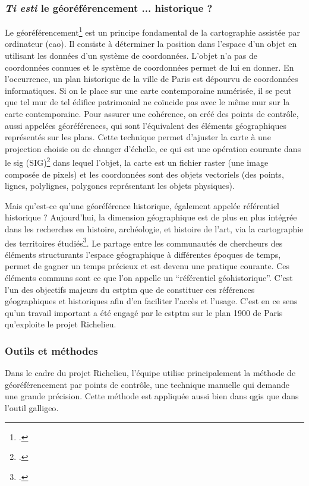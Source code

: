 \subsubsection{\textit{Ti esti} le géoréférencement ... historique ?}
Le géoréférencement\footcite{GEOCONFLUENCESGeoreferencement2024} est un principe fondamental de la cartographie assistée par ordinateur (\acrshort{cao}). Il consiste à déterminer la position dans l'espace d'un objet en utilisant les données d'un système de coordonnées. L'objet n'a pas de coordonnées connues et le système de coordonnées permet de lui en donner. En l'occurrence, un plan historique de la ville de Paris est dépourvu de coordonnées informatiques. Si on le place sur une carte contemporaine numérisée, il se peut que tel mur de tel édifice patrimonial ne coïncide pas avec le même mur sur la carte contemporaine. Pour assurer une cohérence, on créé des points de contrôle, aussi appelées géoréférences, qui sont l'équivalent des éléments géographiques représentés sur les plans. Cette technique permet d'ajuster la carte à une projection choisie ou de changer d'échelle, ce qui est une opération courante dans le \acrlong{sig} (SIG)\footcite{BERNIERconcepts2014} dans lequel l'objet, la carte est un fichier raster (une image composée de pixels) et les coordonnées sont des objets vectoriels (des points, lignes, polylignes, polygones représentant les objets physiques). 

Mais qu'est-ce qu'une géoréférence historique, également appelée référentiel historique ? Aujourd'hui, la dimension géographique est de plus en plus intégrée dans les recherches en histoire, archéologie, et histoire de l'art, via la cartographie des territoires étudiés\footcite{ZOHARGeographic2022, TIMARWeb2024}. Le partage entre les communautés de chercheurs des éléments structurants l’espace géographique à différentes époques de temps, permet de gagner un temps précieux et est devenu une pratique courante. Ces éléments communs sont ce que l'on appelle un \enquote{référentiel géohistorique}. C’est l’un des objectifs majeurs du \acrshort{cstptm} que de constituer ces références géographiques et historiques afin d'en faciliter l’accès et l’usage. C’est en ce sens qu’un travail important a été engagé par le \acrshort{cstptm} sur le plan 1900 de Paris qu'exploite le projet Richelieu.

\subsubsection{Outils et méthodes}\label{par:méthodes}
Dans le cadre du projet Richelieu, l'équipe utilise principalement la méthode de géoréférencement par points de contrôle, une technique manuelle qui demande une grande précision. Cette méthode est appliquée aussi bien dans \acrshort{qgis} que dans l'outil \acrshort{galligeo}. 

